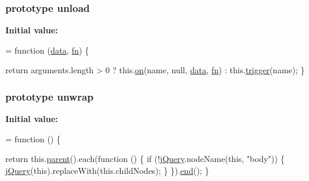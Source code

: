 \subsubsection[{\texorpdfstring{unload}{unload}}]{ {\bf prototype} unload}\hypertarget{jquery-2_82_81-vsdoc_8js_ae048eb914220ef1a45b8cef8fbf97041}{}\label{jquery-2_82_81-vsdoc_8js_ae048eb914220ef1a45b8cef8fbf97041}
{\bfseries Initial value\+:}
\begin{DoxyCode}
= \textcolor{keyword}{function} (\hyperlink{jquery-2_82_81-vsdoc_8js_a609407b3456fdc3c5671a9fc4a226ff7}{data}, \hyperlink{jquery-2_82_81-vsdoc_8js_acef6bdaf6b9b20fdcca1ea86f0902c3b}{fn}) \{
        

        \textcolor{keywordflow}{return} arguments.length > 0 ?
            this.\hyperlink{jquery-2_82_81-vsdoc_8js_ae453b412b883f60220d73468ef6c6dbc}{on}(name, null, \hyperlink{jquery-2_82_81-vsdoc_8js_a609407b3456fdc3c5671a9fc4a226ff7}{data}, \hyperlink{jquery-2_82_81-vsdoc_8js_acef6bdaf6b9b20fdcca1ea86f0902c3b}{fn}) :
            this.\hyperlink{jquery-2_82_81-vsdoc_8js_a2388c4114d5e3e4eab020f973641519c}{trigger}(name);
    \}
\end{DoxyCode}
\subsubsection[{\texorpdfstring{unwrap}{unwrap}}]{ {\bf prototype} unwrap}\hypertarget{jquery-2_82_81-vsdoc_8js_a3916788ca00ed5d623ae18b843eb1bda}{}\label{jquery-2_82_81-vsdoc_8js_a3916788ca00ed5d623ae18b843eb1bda}
{\bfseries Initial value\+:}
\begin{DoxyCode}
= \textcolor{keyword}{function} () \{
        

        \textcolor{keywordflow}{return} this.\hyperlink{jquery-2_82_81-vsdoc_8js_aed9b5e7a755bcccb282f9b06c00a6822}{parent}().each(\textcolor{keyword}{function} () \{
            \textcolor{keywordflow}{if} (!\hyperlink{jquery-2_82_81-vsdoc_8js_add5237586d970a38a81f990e8eb28c6c}{jQuery}.nodeName(\textcolor{keyword}{this}, \textcolor{stringliteral}{"body"})) \{
                \hyperlink{jquery-2_82_81-vsdoc_8js_add5237586d970a38a81f990e8eb28c6c}{jQuery}(\textcolor{keyword}{this}).replaceWith(this.childNodes);
            \}
        \}).\hyperlink{jquery-2_82_81-vsdoc_8js_af2ce7c86b4e6e9d61f85745258f4ef32}{end}();
    \}
\end{DoxyCode}
